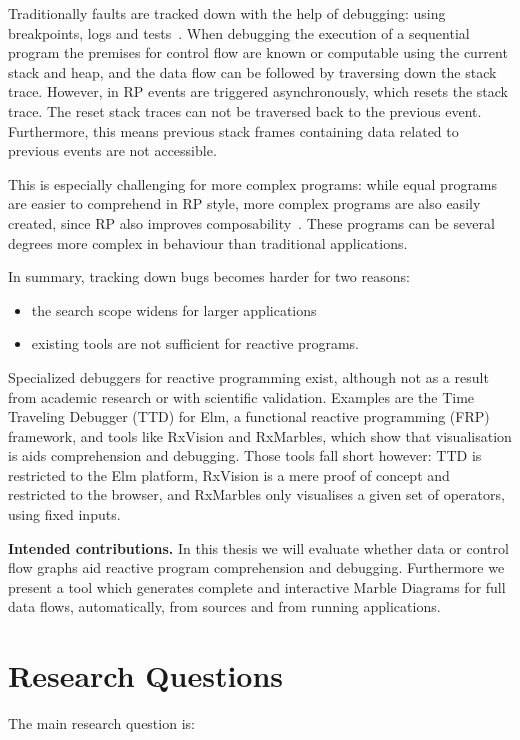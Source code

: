 Traditionally faults are tracked down with the help of debugging:  using
breakpoints, logs and tests~\cite{zeller2009programs}.  When debugging
the execution of a sequential program the premises for control flow are
known or computable using the current stack and heap, and the data flow
can be followed by traversing down the stack trace.  However, in RP
events are triggered asynchronously, which resets the stack trace.  The
reset stack traces can not be traversed back to the previous event.
Furthermore, this means previous stack frames containing data related to
previous events are not accessible.

This is especially challenging for more complex programs:  while equal
programs are easier to comprehend in RP style, more complex programs are
also easily created, since RP also improves composability~\cite{maier2012deprecating}.
These programs can be several degrees more complex in behaviour than
traditional applications.

In summary, tracking down bugs becomes harder for two reasons:

\begin{itemize}
    \item
        the search scope widens for larger applications
    \item
        existing tools are not sufficient for reactive programs.

\end{itemize}

Specialized debuggers for reactive programming exist, although not as a
result from academic research or with scientific validation.  Examples
are the Time Traveling Debugger (TTD) for Elm, a functional reactive
programming (FRP) framework, and tools like RxVision and RxMarbles,
which show that visualisation is aids comprehension and debugging. Those
tools fall short however:  TTD is restricted to the Elm platform,
RxVision is a mere proof of concept and restricted to the browser, and
RxMarbles only visualises a given set of operators, using fixed inputs.

\textbf{Intended contributions.} In this thesis we will evaluate whether
data or control flow graphs aid reactive program comprehension and
debugging.  Furthermore we present a tool which generates complete and
interactive Marble Diagrams for full data flows, automatically, from
sources and from running applications.

\section{Research Questions}%
\label{sec:questions} The main research question is:

